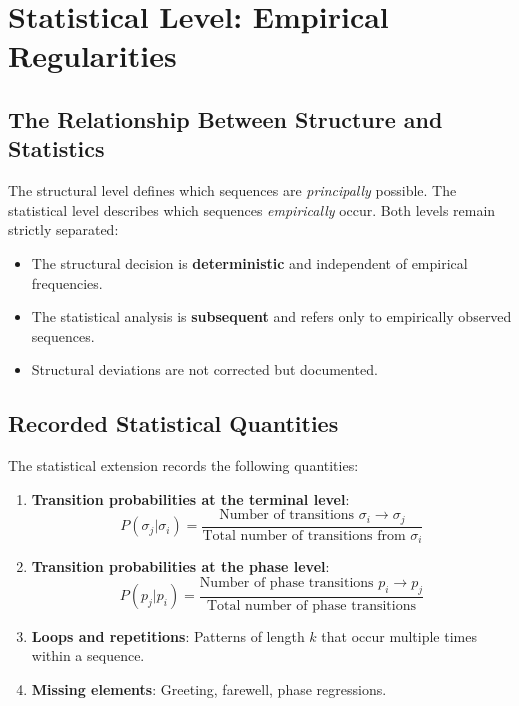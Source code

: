 \documentclass[
  12pt,
  a4paper,
  oneside,
  titlepage
]{article}
\begin{document}
\section{Statistical Level: Empirical Regularities}

\subsection{The Relationship Between Structure and Statistics}

The structural level defines which sequences are \textit{principally} possible. 
The statistical level describes which sequences \textit{empirically} occur. 
Both levels remain strictly separated:

\begin{itemize}
    \item The structural decision is \textbf{deterministic} and independent of 
    empirical frequencies.
    
    \item The statistical analysis is \textbf{subsequent} and refers only to 
    empirically observed sequences.
    
    \item Structural deviations are not corrected but documented.
\end{itemize}

\subsection{Recorded Statistical Quantities}

The statistical extension records the following quantities:

\begin{enumerate}
    \item \textbf{Transition probabilities at the terminal level}:
    \[
    P(\sigma_j | \sigma_i) = \frac{\text{Number of transitions } \sigma_i \to \sigma_j}{\text{Total number of transitions from } \sigma_i}
    \]
    
    \item \textbf{Transition probabilities at the phase level}:
    \[
    P(p_j | p_i) = \frac{\text{Number of phase transitions } p_i \to p_j}{\text{Total number of phase transitions}}
    \]
    
    \item \textbf{Loops and repetitions}: Patterns of length \(k\) that occur 
    multiple times within a sequence.
    
    \item \textbf{Missing elements}: Greeting, farewell, phase regressions.
\end{enumerate}
\end{document}
